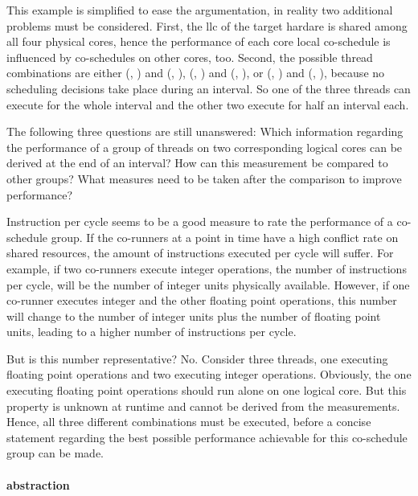 This example is simplified to ease the argumentation, in reality two additional
problems must be considered.
First, the \gls{llc} of the target hardare is shared among all four physical cores,
hence the performance of each core local co-schedule is influenced by
co-schedules on other cores, too.
Second, the possible thread combinations are either (\alpha, \beta) and
(\gamma, \beta), (\alpha, \beta) and (\alpha, \gamma), or (\alpha, \gamma) and
(\beta, \gamma), because no scheduling decisions take place during an interval.
So one of the three threads can execute for the whole interval and the other
two execute for half an interval each.

The following three questions are still unanswered:
Which information regarding the performance of a group of threads on two
corresponding logical cores can be derived at the end of an interval?
How can this measurement be compared to other groups?
What measures need to be taken after the comparison to improve performance?

Instruction per cycle seems to be a good measure to rate the performance of a
co-schedule group.
If the co-runners at a point in time have a high conflict
rate on shared resources, the amount of instructions executed per cycle will
suffer.
For example, if two co-runners execute integer operations, the number of
instructions per cycle, will be the number of integer units physically available.
However, if one co-runner executes integer and the other floating point
operations, this number will change to the number of integer units plus
the number of floating point units, leading to a higher number of instructions
per cycle.

But is this number representative? No. Consider three threads, one executing
floating point operations and two executing integer operations. Obviously, the
one executing floating point operations should run alone on one logical core.
But this property is
unknown at runtime and cannot be derived from the measurements.
Hence, all three different combinations must be executed, before a concise
statement regarding the best possible performance achievable for this 
co-schedule group can be made.

\paragraph{abstraction}
